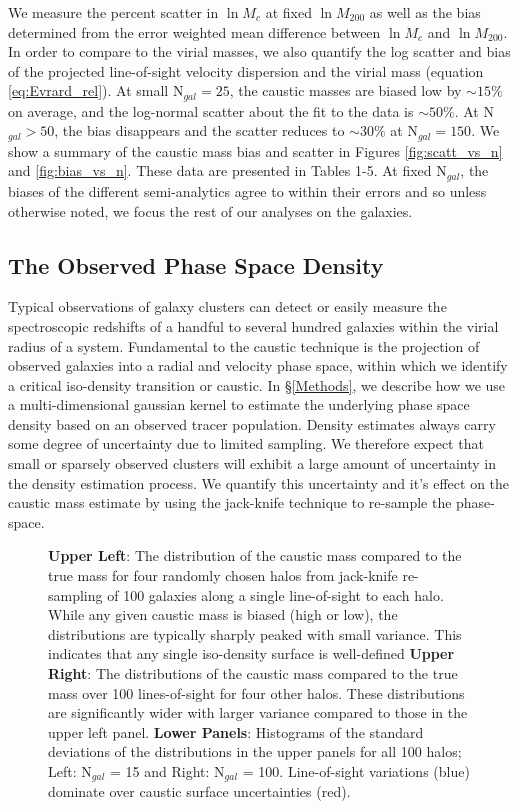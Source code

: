 \documentclass[iop]{emulateapj}
\begin{document}
We measure the percent scatter in $\ln M_{c}$ at fixed $\ln M_{200}$ as well as the bias determined from the error weighted mean difference between $\ln M_{c}$ and $\ln M_{200}$. In order to compare to the virial masses, we also quantify the log scatter and bias of the projected line-of-sight velocity dispersion and the virial mass (equation \ref{eq:Evrard_rel}). At small N$_{gal} = 25$, the caustic masses are biased low by $\sim 15\%$ on average, and the log-normal scatter about the fit to the data is $\sim 50\%$. At N$_{gal} > 50$, the bias disappears and the scatter reduces to $\sim 30\%$ at N$_{gal} = 150$. We show a summary of the caustic mass bias and scatter in Figures \ref{fig:scatt_vs_n} and \ref{fig:bias_vs_n}. These data are presented in Tables 1-5. At fixed N$_{gal}$, the biases of the different semi-analytics agree to within their errors and so unless otherwise noted, we focus the rest of our analyses on the \citet{Guo11} galaxies. 

\subsection{The Observed Phase Space Density}
\label{sec:results_surface}

Typical observations of galaxy clusters can detect or easily measure the spectroscopic redshifts of a handful to several hundred galaxies within the virial radius of a system. Fundamental to the caustic technique is the projection of observed galaxies into a radial and velocity phase space, within which we identify a critical iso-density transition or caustic. In \S \ref{Methods}, we describe how we use a multi-dimensional gaussian kernel to estimate the underlying phase space density based on an observed tracer population. Density estimates always carry some degree of uncertainty due to limited sampling. We therefore expect that small or sparsely observed clusters will exhibit a large amount of uncertainty in the density estimation process. We quantify this uncertainty and it's effect on the caustic mass estimate by using the jack-knife technique to re-sample the phase-space. 

\begin{figure*}
\caption{{\bf Upper Left}: The distribution of the caustic mass compared to the true mass for four randomly chosen halos from jack-knife re-sampling of 100 galaxies along a single line-of-sight to each halo. While any given caustic mass is biased (high or low), the distributions are typically sharply peaked with small variance. This indicates that any single iso-density surface is well-defined {\bf Upper Right}: The distributions of the caustic mass compared to the true mass over 100 lines-of-sight for four other halos. These distributions are significantly wider with larger variance compared to those in the upper left panel. {\bf Lower Panels}: Histograms of the standard deviations of the distributions in the upper panels for all 100 halos; Left: N$_{gal}$ = 15 and Right: N$_{gal}$ = 100. Line-of-sight variations (blue) dominate over caustic surface uncertainties (red).\label{fig:frac_scat}}
\end{figure*}
\end{document}
